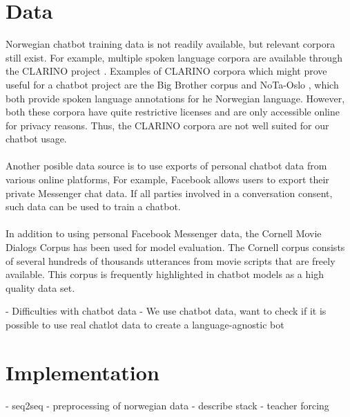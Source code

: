 \documentclass{article}
\begin{document}
\section{Data}

Norwegian chatbot training data is not readily available, but relevant corpora
still exist.  For example, multiple spoken language corpora are available
through the CLARINO project \cite{clarino-about}. Examples of CLARINO
corpora which might prove useful for a chatbot project are the Big Brother
corpus \cite{clarino-bb} and NoTa-Oslo \cite{clarino-nota}, which both provide
spoken language annotations for he Norwegian language. However, both these
corpora have quite restrictive licenses and are only accessible online for
privacy reasons. Thus, the CLARINO corpora are not well suited for our chatbot
usage.

\paragraph{}
Another posible data source is to use exports of personal chatbot data from
various online platforms, For example, Facebook allows users to export their
private Messenger chat data. If all parties involved in a conversation consent,
such data can be used to train a chatbot.


\paragraph{}
In addition to using personal Facebook Messenger data, the Cornell Movie
Dialogs Corpus \cite{cornell-corpus} has been used for model evaluation. The
Cornell corpus consists of several hundreds of thousands utterances from movie
scripts that are freely available. This corpus is frequently highlighted in
chatbot models as a high quality data set.

\if
- Difficulties with chatbot data 
- We use chatbot data, want to check if it is possible to use real chatlot data
to create a language-agnostic bot 
\fi

\section{Implementation}

\if
- seq2seq 
- preprocessing of norwegian data - describe stack 
- teacher forcing
\fi

\end{document}
